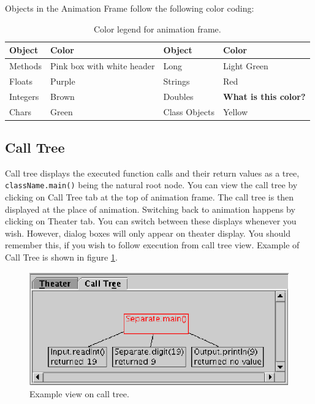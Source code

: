 \documentclass[a4paper,11pt,english]{article}
\newcommand{\p}[1]{\texttt{#1}}
\newcommand{\bu}[1]{\textsf{#1}}
\begin{document}
{%
Objects in the Animation Frame follow the following color coding:

\begin{table}[ht]
\begin{center}
\caption{\label{tbl:colors}Color legend for animation frame.}
\begin{tabular}{l|l|l|l}
\hline
\textbf{Object} & \textbf{Color} & \textbf{Object} & \textbf{Color} \\
\hline
Methods & Pink box with white header &
Long & Light Green \\
Floats & Purple &
Strings & Red \\
Integers & Brown &
Doubles & \textbf{What is this color?} \\
Chars & Green &
Class Objects & Yellow \\
\hline
\end{tabular}
\end{center}
\end{table}

\subsection{Call Tree}


Call tree displays the executed function calls and their return values as a tree, \p{className.main()} being the natural root node. You can view the call tree by clicking on \bu{Call Tree} tab at the top of animation frame. The call tree is then displayed at the place of animation. Switching back to animation happens by clicking on \bu{Theater} tab. You can switch between these displays whenever you wish. However, dialog boxes will only appear on theater display. You should remember this, if you wish to follow execution from call tree view. Example of Call Tree is shown in figure \ref{fig:calltree}.

\begin{figure}[ht]
\begin{center}
\includegraphics{images/calltree.eps}
\caption{\label{fig:calltree}Example view on call tree.}
\end{center}
\end{figure}

}
\end{document}
